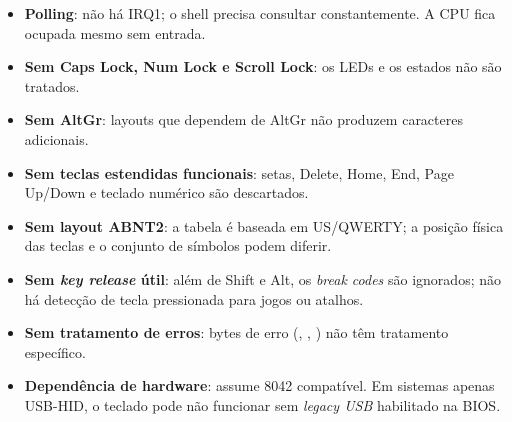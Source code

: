 \begin{itemize}
  \item \textbf{Polling}: n\~ao h\'a IRQ1; o shell precisa consultar
        constantemente. A CPU fica ocupada mesmo sem entrada.
  \item \textbf{Sem Caps Lock, Num Lock e Scroll Lock}: os LEDs e os estados
        n\~ao s\~ao tratados.
  \item \textbf{Sem AltGr}: layouts que dependem de AltGr n\~ao produzem
        caracteres adicionais.
  \item \textbf{Sem teclas estendidas funcionais}: setas, Delete, Home, End,
        Page Up/Down e teclado num\'erico s\~ao descartados.
  \item \textbf{Sem layout ABNT2}: a tabela \'e baseada em US/QWERTY; a
        posi\c{c}\~ao f\'isica das teclas e o conjunto de s\'imbolos podem
        diferir.
  \item \textbf{Sem \emph{key release} \'util}: al\'em de Shift e Alt, os
        \emph{break codes} s\~ao ignorados; n\~ao h\'a detec\c{c}\~ao de tecla
        pressionada para jogos ou atalhos.
  \item \textbf{Sem tratamento de erros}: bytes de erro (,
        , ) n\~ao t\^em tratamento espec\'ifico.
  \item \textbf{Depend\^encia de hardware}: assume 8042 compat\'ivel. Em
        sistemas apenas USB-HID, o teclado pode n\~ao funcionar sem
        \emph{legacy USB} habilitado na BIOS.
\end{itemize}
